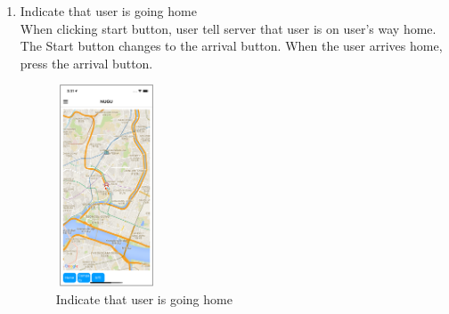 \documentclass[conference]{IEEEtran}
\begin{document}
\begin{enumerate}
    \item Indicate that user is going home\\
    When clicking start button, user tell server that user is on user’s way home. The Start button changes to the arrival button. When the user arrives home, press the arrival button.\\
    \begin{figure}[htbp]
        \centering
        \includegraphics[width=3cm, height=6cm]{images/figure13.png}
        \caption{Indicate that user is going home}
    \end{figure}
    \\
    

\end{enumerate}
\end{document}
